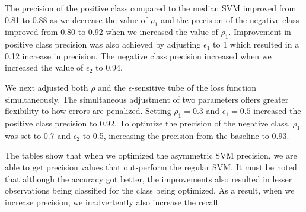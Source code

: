 \documentclass[twoside,11pt]{article}
\begin{document}


The precision of the positive class compared to the median SVM improved from 0.81 to 0.88 as we decrease the value of $\rho_1$ and the precision of the negative class improved from 0.80 to 0.92 when we increased the value of $\rho_1$. Improvement in positive class precision was also achieved by adjusting $\epsilon_1$ to 1 which resulted in a 0.12 increase in precision. The negative class precision increased when we increased the value of $\epsilon_2$ to 0.94. 


We next adjusted both $\rho$ and the $\epsilon$-sensitive tube of the loss function simultaneously. The simultaneous adjustment of two parameters offers greater flexibility to how errors are penalized. Setting $\rho_1=0.3$ and $\epsilon_1=0.5$ increased the positive class precision to 0.92. To optimize the precision of the negative class, $\rho_1$ was set to 0.7 and $\epsilon_2$ to 0.5, increasing the precision from the baseline to 0.93. 

The tables show that when we optimized the asymmetric SVM precision, we are able to get precision values that out-perform the regular SVM. It must be noted that although the accuracy got better, the improvements also resulted in lesser observations being classified for the class being optimized. As a result, when we increase precision, we inadvertently also increase the recall. 
\end{document}
